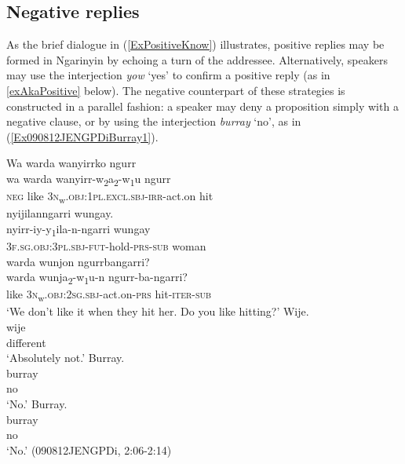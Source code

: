 \documentclass[output=paper,colorlinks,citecolor=brown]{langscibook}
\begin{document}
\subsection{Negative replies}

As the brief dialogue in (\ref{ExPositiveKnow}) illustrates, positive replies may be formed in Ngarinyin by echoing a turn of the addressee. Alternatively, speakers may use the interjection \textit{yow} `yes' to confirm a positive reply (as in \ref{exAkaPositive} below). The negative counterpart of these strategies is constructed in a parallel fashion: a speaker may deny a proposition simply with a negative clause, or by using the interjection \textit{burray} `no', as in (\ref{Ex090812JENGPDiBurray1}).

\begin{exe}
\ex\label{Ex090812JENGPDiBurray1}
\begin{xlist}[NG:]
    \glll Wa warda wanyirrko ngurr \\
        wa warda wanyirr-w\textsubscript{2}a\textsubscript{2}-w\textsubscript{1}u ngurr \\
        \textsc{neg} like 3\textsc{n}\textsubscript{w}.\textsc{obj:1pl.excl.sbj-irr}-act.on hit \\
    \trans 
    \glll nyijilanngarri wungay.  \\
        nyirr-iy-y\textsubscript{1}ila-n-ngarri wungay \\
        \textsc{3f.sg.obj:3pl.sbj-fut}-hold-\textsc{prs}-\textsc{sub} woman \\
    \trans 
    \glll warda wunjon ngurrbangarri?\\
        warda wunja\textsubscript{2}-w\textsubscript{1}u-n ngurr-ba-ngarri?\\
        like 3\textsc{n}\textsubscript{w}.\textsc{obj:2sg.sbj}-act.on-\textsc{prs} hit-\textsc{iter}-\textsc{sub} \\ 
    \trans `We don't like it when they hit her. Do you like hitting?'
    \glll Wije.\\
        wije\\
        different\\
    \trans `Absolutely not.'
 \glll Burray.\\
        burray\\
        no\\
    \trans `No.'
 \glll Burray.\\
        burray\\
        no\\
    \trans `No.' (090812JENGPDi, 2:06-2:14)
\end{xlist}
\end{exe}
\end{document}
